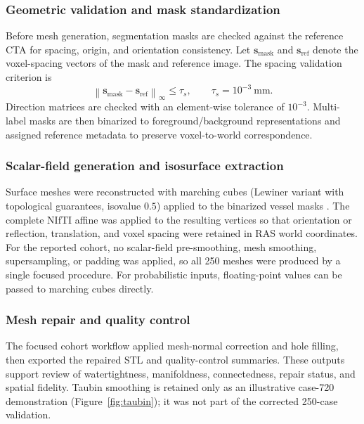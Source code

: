 \documentclass[anonymous]{iopjournal}
\begin{document}
\subsubsection{Geometric validation and mask standardization}

Before mesh generation, segmentation masks are checked against the reference CTA for spacing, origin, and orientation consistency. Let $\mathbf{s}_{\mathrm{mask}}$ and $\mathbf{s}_{\mathrm{ref}}$ denote the voxel-spacing vectors of the mask and reference image. The spacing validation criterion is
\begin{equation}
\left\lVert \mathbf{s}_{\mathrm{mask}} - \mathbf{s}_{\mathrm{ref}} \right\rVert_{\infty}
\leq \tau_s,
\qquad
\tau_s = 10^{-3}\ \mathrm{mm}.
\label{eq:spacing}
\end{equation}
Direction matrices are checked with an element-wise tolerance of $10^{-3}$. Multi-label masks are then binarized to foreground/background representations and assigned reference metadata to preserve voxel-to-world correspondence.

\subsubsection{Scalar-field generation and isosurface extraction}

Surface meshes were reconstructed with marching cubes (Lewiner variant with topological guarantees, isovalue $0.5$) applied to the binarized vessel masks \cite{lorensen1987,lewiner2003}. The complete NIfTI affine was applied to the resulting vertices so that orientation or reflection, translation, and voxel spacing were retained in RAS world coordinates. For the reported cohort, no scalar-field pre-smoothing, mesh smoothing, supersampling, or padding was applied, so all 250 meshes were produced by a single focused procedure. For probabilistic inputs, floating-point values can be passed to marching cubes directly.

\subsubsection{Mesh repair and quality control}

The focused cohort workflow applied mesh-normal correction and hole filling, then exported the repaired STL and quality-control summaries. These outputs support review of watertightness, manifoldness, connectedness, repair status, and spatial fidelity. Taubin smoothing \cite{taubin1995} is retained only as an illustrative case-720 demonstration (Figure~\ref{fig:taubin}); it was not part of the corrected 250-case validation.
\end{document}
